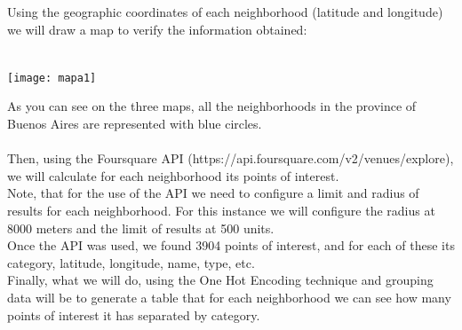 \documentclass[12pt,a4paper]{tesis}
\begin{document}
Using the geographic coordinates of each neighborhood (latitude and longitude) we will draw a map to verify the information obtained: \\ \\

\centerline{
	\texttt{[image: mapa1]}
}


As you can see on the three maps, all the neighborhoods in the province of Buenos Aires are represented with blue circles.
\\ \\
Then, using the Foursquare API (https://api.foursquare.com/v2/venues/explore), we will calculate for each neighborhood its points of interest. \\
Note, that for the use of the API we need to configure a limit and radius of results for each neighborhood. For this instance we will configure the radius at 8000 meters and the limit of results at 500 units. \\
Once the API was used, we found 3904 points of interest, and for each of these its category, latitude, longitude, name, type, etc. \\
Finally, what we will do, using the One Hot Encoding technique and grouping data will be to generate a table that for each neighborhood we can see how many points of interest it has separated by category. \\
\end{document}
